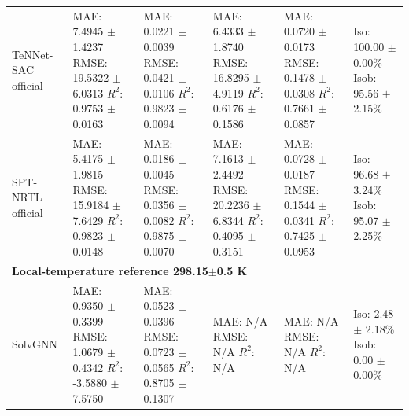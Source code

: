 \begin{tabular}{llllll}
TeNNet-SAC official & \shortstack[l]{MAE: 7.4945 $\pm$ 1.4237 \\ RMSE: 19.5322 $\pm$ 6.0313 \\ $R^2$: 0.9753 $\pm$ 0.0163} & \shortstack[l]{MAE: 0.0221 $\pm$ 0.0039 \\ RMSE: 0.0421 $\pm$ 0.0106 \\ $R^2$: 0.9823 $\pm$ 0.0094} & \shortstack[l]{MAE: 6.4333 $\pm$ 1.8740 \\ RMSE: 16.8295 $\pm$ 4.9119 \\ $R^2$: 0.6176 $\pm$ 0.1586} & \shortstack[l]{MAE: 0.0720 $\pm$ 0.0173 \\ RMSE: 0.1478 $\pm$ 0.0308 \\ $R^2$: 0.7661 $\pm$ 0.0857} & \shortstack[l]{Iso: 100.00 $\pm$ 0.00\% \\ Isob: 95.56 $\pm$ 2.15\%} \\
SPT-NRTL official & \shortstack[l]{MAE: 5.4175 $\pm$ 1.9815 \\ RMSE: 15.9184 $\pm$ 7.6429 \\ $R^2$: 0.9823 $\pm$ 0.0148} & \shortstack[l]{MAE: 0.0186 $\pm$ 0.0045 \\ RMSE: 0.0356 $\pm$ 0.0082 \\ $R^2$: 0.9875 $\pm$ 0.0070} & \shortstack[l]{MAE: 7.1613 $\pm$ 2.4492 \\ RMSE: 20.2236 $\pm$ 6.8344 \\ $R^2$: 0.4095 $\pm$ 0.3151} & \shortstack[l]{MAE: 0.0728 $\pm$ 0.0187 \\ RMSE: 0.1544 $\pm$ 0.0341 \\ $R^2$: 0.7425 $\pm$ 0.0953} & \shortstack[l]{Iso: 96.68 $\pm$ 3.24\% \\ Isob: 95.07 $\pm$ 2.25\%} \\
\hline
\multicolumn{6}{l}{\textbf{Local-temperature reference 298.15$\pm$0.5 K}} \\
SolvGNN & \shortstack[l]{MAE: 0.9350 $\pm$ 0.3399 \\ RMSE: 1.0679 $\pm$ 0.4342 \\ $R^2$: -3.5880 $\pm$ 7.5750} & \shortstack[l]{MAE: 0.0523 $\pm$ 0.0396 \\ RMSE: 0.0723 $\pm$ 0.0565 \\ $R^2$: 0.8705 $\pm$ 0.1307} & \shortstack[l]{MAE: N/A \\ RMSE: N/A \\ $R^2$: N/A} & \shortstack[l]{MAE: N/A \\ RMSE: N/A \\ $R^2$: N/A} & \shortstack[l]{Iso: 2.48 $\pm$ 2.18\% \\ Isob: 0.00 $\pm$ 0.00\%} \\

\end{tabular}
